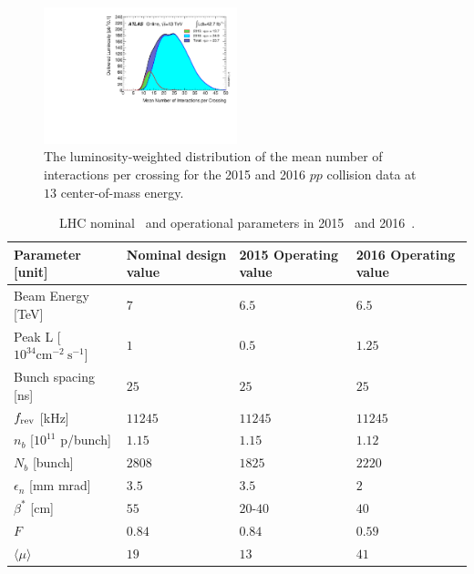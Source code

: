 \begin{figure}[htbp!]
  \centering
  \captionsetup{justification=centering}
  \includegraphics[width=0.5\textwidth,angle=-90]{figures/detector/Mu_2015_2016}
   \caption{The luminosity-weighted distribution of the mean number of interactions per crossing for the 2015 and 2016 $pp$ collision data at $13$ \TeV center-of-mass energy.~\cite{Lumi_Run2}}
  \label{fig:Mu_2015_2016}
\end{figure}
\begin{table}[]
\centering
\begin{tabular*}{\textwidth}{@{\extracolsep{\fill}}llll}
\hline
Parameter [unit]   & Nominal design value & 2015 Operating value  & 2016 Operating value\\
\hline\hline
Beam Energy [TeV]  & $7$  & $6.5$  & $6.5$  \\
Peak L [$10^{34} \text{cm}^{−2}~\text{s}^{-1}$]   & $1$ &   $0.5$  & $1.25$           \\
Bunch spacing [ns]             &      $25$  &  $25$ &      $25$ \\
$f_{\rm rev}$ [kHz]    &     $11245$  & $11245$  & $11245$ \\
$n_b$  [$10^{11}$ p/bunch]   & $1.15$ &  $1.15$ & $1.12$\\
$N_b$  [bunch]         & $2808$   &      $1825$ &      $2220$\\
$\epsilon_n$  [mm mrad]        & $3.5$ &  $3.5$  & $2$\\
$\beta^*$   [cm]         & $55$  &   $20$-$40$  & $40$\\
$F$        &      $0.84$  & $0.84$  &  $0.59$ \\
$\langle \mu \rangle$ & $19$ & $13$ & $41$ \\ \hline
\hline            
\end{tabular*}
\caption[LHC nominal and operational parameters]{LHC nominal~\cite{LHCPaper} and operational parameters in 2015~\cite{LHC_2015} and 2016~\cite{LHC_2016}.}
\label{Ch2:tab-lhc}
\end{table}


